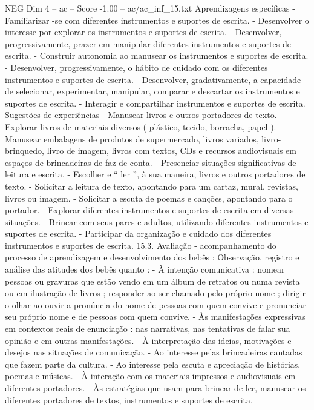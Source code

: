 \begin{textsample}{NEG Dim 4 – ac – Score -1.00 – ac/ac\_inf\_15.txt}
Aprendizagens específicas - Familiarizar -se com diferentes instrumentos e suportes de escrita. - Desenvolver o interesse por explorar os instrumentos e suportes de escrita. - Desenvolver, progressivamente, prazer em manipular diferentes instrumentos e suportes de escrita. - Construir autonomia ao manusear os instrumentos e suportes de escrita. - Desenvolver, progressivamente, o hábito de cuidado com os diferentes instrumentos e suportes de escrita. - Desenvolver, gradativamente, a capacidade de selecionar, experimentar, manipular, comparar e descartar os instrumentos e suportes de escrita. - Interagir e compartilhar instrumentos e suportes de escrita.
Sugestões de experiências - Manusear livros e outros portadores de texto. - Explorar livros de materiais diversos ( plástico, tecido, borracha, papel ). - Manusear embalagens de produtos de supermercado, livros variados, livro-brinquedo, livro de imagem, livros com textos, CDs e recursos audiovisuais em espaços de brincadeiras de faz de conta. - Presenciar situações significativas de leitura e escrita. - Escolher e “ ler ”, à sua maneira, livros e outros portadores de texto. - Solicitar a leitura de texto, apontando para um cartaz, mural, revistas, livros ou imagem. - Solicitar a escuta de poemas e canções, apontando para o portador. - Explorar diferentes instrumentos e suportes de escrita em diversas situações. - Brincar com seus pares e adultos, utilizando diferentes instrumentos e suportes de escrita. - Participar da organização e cuidado dos diferentes instrumentos e suportes de escrita. 15.3.
Avaliação - acompanhamento do processo de aprendizagem e desenvolvimento dos bebês : Observação, registro e análise das atitudes dos bebês quanto : - À intenção comunicativa : nomear pessoas ou gravuras que estão vendo em um álbum de retratos ou numa revista ou em ilustração de livros ; responder ao ser chamado pelo próprio nome ; dirigir o olhar ao ouvir a pronúncia do nome de pessoas com quem convive e pronunciar seu próprio nome e de pessoas com quem convive. - Às manifestações expressivas em contextos reais de enunciação : nas narrativas, nas tentativas de falar sua opinião e em outras manifestações. - À interpretação das ideias, motivações e desejos nas situações de comunicação. - Ao interesse pelas brincadeiras cantadas que fazem parte da cultura. - Ao interesse pela escuta e apreciação de histórias, poemas e músicas. - À interação com os materiais impressos e audiovisuais em diferentes portadores. - Às estratégias que usam para brincar de ler, manusear os diferentes portadores de textos, instrumentos e suportes de escrita.

\end{textsample}
